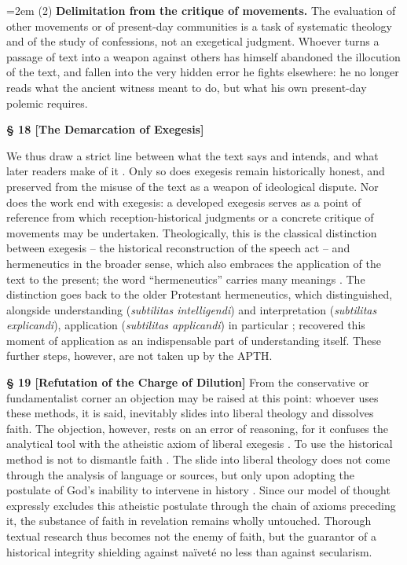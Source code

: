 \documentclass[11pt,a4paper]{article}
\makeatletter
\newcommand{\apth}{{\apthfont APTH}\hspace{0.15em}\xspace}
\newcommand{\subpar}[1]{%
  \begingroup
  \leftskip=2em %
  \noindent#1\par
  \endgroup
}
\newcommand{\apthsec}[3]{%
  \phantomsection%
  \def\@currentlabel{#1}%
  \label{sec:#3}%
  \textbf{§ #1 [#2]}%
}
\makeatother
\begin{document}
\subpar{(2) \textbf{Delimitation from the critique of movements.} The evaluation of other movements or of present-day communities is a task of systematic theology and of the study of confessions, not an exegetical judgment. Whoever turns a passage of text into a weapon against others has himself abandoned the illocution of the text, and fallen into the very hidden error he fights elsewhere: he no longer reads what the ancient witness meant to do, but what his own present-day polemic requires.}

\apthsec{18}{The Demarcation of Exegesis}{abgrenzung-exegese}
We thus draw a strict line between what the text says and intends, and what later readers make of it \citep{hirsch1967}. Only so does exegesis remain historically honest, and preserved from the misuse of the text as a weapon of ideological dispute. Nor does the work end with exegesis: a developed exegesis serves as a point of reference from which reception-historical judgments or a concrete critique of movements may be undertaken. Theologically, this is the classical distinction between exegesis -- the historical reconstruction of the speech act -- and hermeneutics in the broader sense, which also embraces the application of the text to the present; the word ``hermeneutics'' carries many meanings \citep{ebeling1959}. The distinction goes back to the older Protestant hermeneutics, which distinguished, alongside understanding (\textit{subtilitas intelligendi}) and interpretation (\textit{subtilitas explicandi}), application (\textit{subtilitas applicandi}) in particular \citep{rambach1723}; \citet{gadamer1960} recovered this moment of application as an indispensable part of understanding itself. These further steps, however, are not taken up by the \apth.

\apthsec{19}{Refutation of the Charge of Dilution}{verwaesserung} From the conservative or fundamentalist corner an objection may be raised at this point: whoever uses these methods, it is said, inevitably slides into liberal theology and dissolves faith. The objection, however, rests on an error of reasoning, for it confuses the analytical tool with the atheistic axiom of liberal exegesis \citep{schlatter1905,troeltsch1913}. To use the historical method is not to dismantle faith \citep{stuhlmacher1979,wright1992,enns2005,sparks2008}. The slide into liberal theology does not come through the analysis of language or sources, but only upon adopting the postulate of God's inability to intervene in history \citep{harvey1966,lessing1777}. Since our model of thought expressly excludes this atheistic postulate through the chain of axioms preceding it, the substance of faith in revelation remains wholly untouched. Thorough textual research thus becomes not the enemy of faith, but the guarantor of a historical integrity shielding against naïveté no less than against secularism.
\end{document}
